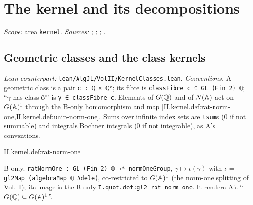 \chapter{The kernel and its decompositions}\label{ch:ch-03-kernel}

\noindent\emph{Scope:} area \texttt{kernel}. \emph{Sources:} \cite[§§1--2]{A-I}; \cite[§§4, 6, 7, 10, 12]{AIntro}; \cite[Lectures II--III]{Gel}; \cite[§§1--3]{A-R1}.


\section{Geometric classes and the class kernels}\label{sec:kernel-classes}

\noindent\emph{Lean counterpart:} \texttt{lean/AlgJL/VolII/KernelClasses.lean}. \emph{Conventions.} A geometric class is a pair
\texttt{c : ℚ × ℚˣ}; its fibre is \texttt{classFibre c ⊆ GL (Fin 2) ℚ}; ``$\gamma$ has class $\mathcal O$'' is \texttt{γ ∈ classFibre c}. Elements of $G(\mathbb{Q})$ and of
$N(\mathbb{A})$ act on $G(\mathbb{A})^1$ through the B-only homomorphism and map \cref{II.kernel.def:rat-norm-one,II.kernel.def:unip-norm-one}. Sums over infinite index sets are
\texttt{tsum}s ($0$ if not summable) and integrals Bochner integrals ($0$ if not integrable), as A's conventions.

\begin{definition}
\bonly
{}
\end{definition}
\begin{tfformal}{II.kernel.def:rat-norm-one}
\begin{tffidelity}
B-only. \texttt{ratNormOne : GL (Fin 2) ℚ →* normOneGroup}, $\gamma\mapsto\iota(\gamma)$ with $\iota$ = \texttt{gl2Map (algebraMap ℚ Adele)}, co-restricted to $G(\mathbb{A})^1$ (the norm-one splitting of Vol.~I); its image is the B-only \texttt{I.quot.def:gl2-rat-norm-one}. It renders A's ``$G(\mathbb{Q})\subseteq G(\mathbb{A})^1$''.
\end{tffidelity}
\end{tfformal}

